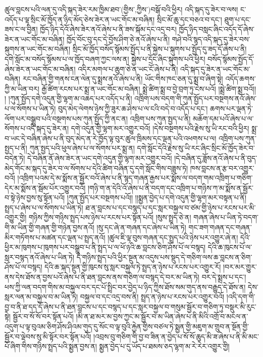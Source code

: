 ཚུལ་བླངས་པའི་ལན་དུ་འདི་སྐད་ཟེར་རམ་ཁྱིམ་ཐབ་(གྱིས་‚ཀྱིས་)བསྒོ་བའི་ཕྱིར། འདི་སྐད་དུ་ཟེར་བ་ལས། ང་འདོད་པ་ལྟ་སྲིང་མོ་ཁྱོད་ན་ཉིད་མོད་ཅེས་ཟེར་ན་ཡང་གོང་མ་བཞིན། སྲིང་མོ་ཆུ་དང་བཅའ་བ་དང་། ཐུག་པ་དང་ཟས་ང་ལ་བྱིན། ཁྱོད་ཉིད་དེའོ་ཞེས་ཟེར་ནའོ་ཞེས་པ་ནི་ཟས་སྐོམ་དང་འདྲ་བར། ཁྱོད་ཉིད་བསླང་ཞིང་འདོད་དོ་ཞེས་ཟེར་ན་ཡང་གོང་མ་བཞིན། ཁྱོད་བོང་བུ་དང་དེ་བྱོས་ཤིག་ཅེ་ནའོ་ཞེས་པ་ནི། གཤེ་བའི་སྙད་འདི་སྐད་དུ་ཟེར་བས་སྐུགས་ན་ཡང་གོང་མ་བཞིན། སྲིང་མོ་ཁྱོད་བསོད་སྙོམས་སྤྱོད་པ་ནི་སྐྱེས་པ་སྐུགས་པ་སྤྱོད་དུ་ཟད་དོ་ཞེས་པ་ནི། དགེ་སློང་མ་བསོད་སྙོམས་པ་ལ་ཁྱོད་བཞག་ཀྱང་ལས་ན། སྐྱེས་པ་དྲོང་ཞིང་སྐུགས་པའི་ཕྱིར། བསོད་སྙོམས་སྤྱོད་དོ་ཞེས་ཟེར་ན་ཡང་གོང་མ་བཞིན། འདིར་མགལ་པ་ཆུག་ཅེ་ན་ཡང་ངོ་ཞེས་པ་ནི། འདི་སྐད་དུ་ཟེར་ན་ཡང་གོང་མ་བཞིན། རང་བཞིན་གྱི་གནས་ངན་ལེན་དུ་སྨྲས་ནའོ་ཞེས་པ་ནི། ཡོང་གིས་ཁང་ཅན་དུ་སྨྲ་བ་ཞིག་སྟེ། འདོད་ཆགས་ཀྱི་མ་ཡིན་བར། རྒྱོ་ཚིག་རངས་པར་སྨྲ་ན་ཡང་གོང་མ་བཞིན། སྨྲེ་ཚིག་སྨྲ་བ་བྱེ་བྲག་ཏུ་ངེས་པའོ། །སྨྲེ་ཚིག་སྨྲ་བའོ།། །
།ཀུན་སྤྱོད་དགེ་འདུན་གྱི་ལྷག་མ་འཆད་པར་འདོད་པ་ནི། འཁྲིག་པས་བདག་གི་ཀུན་སྤྱོད་པར་བསྔགས་ནའོ་ཞེས་པ་ལ་སོགས་པ་ཡིན་ཏེ། བུད་མེད་ལེགས་ཉེས་ཀྱི་ཟུར་ཆ་ཤེས་པ་ལ་ངའི་བདེ་བ་འདོད་པ་དང་། ཆགས་པར་ལྡན་ཏེ་ལོག་པར་བསྒྲུབ་པའི་བསྔགས་པས་ཀུན་སྤྱོད་ཀྱི་ནང་ན། འཁྲིག་པས་ཀུན་སྤྱད་པ་ནི། མཆོག་དམ་པའོ་ཞེས་པ་ལ་སོགས་པ་འདི་སྐད་དུ་ཟེར་ན། དགེ་འདུན་གྱི་ལྷག་མར་འགྱུར་བའོ། །དེས་བསྔགས་པའི་རྗེས་སུ་ཡི་རང་བའི་ཕྱིར། སྨྲ་བ་ཡང་དེ་བཞིན་ཞེས་པ་ནི་བུད་མེད་ན་རེ་ཁྱོད་ལྟ་བུར་ཚུལ་ཁྲིམས་དང་ལྡན་པའི་འཕགས་པ་ལ། འཁྲིག་པས་ཀུན་སྤྱད་པ་ནི། ཀུན་སྤྱད་པའི་ཕུལ་ཞེས་པ་ལ་སོགས་པར་སྨྲ་ན། དགེ་སློང་དེའི་རྗེས་སུ་ཡི་རང་ཞིང་སྲིང་མོ་ཁྱོད་ཟེར་བ་བདེན་ཏེ། དེ་བཞིན་ནོ་ཞེས་ཟེར་ན་ཡང་དགེ་འདུན་གྱི་ལྷག་མར་འགྱུར་བའོ། །དེ་བཞིན་དུ་ཟློས་ནའོ་ཞེས་པ་ནི་བུད་མེད་གོང་མ་སྐད་དུ་ཟེར་བ་ལ་སོགས་པ་དེའི་ཚིག་བཞིན་དུ་དགེ་སློང་གིས་བཟླས་ཏེ། ཁས་བླངས་ན་རྩ་བར་འགྱུར་བའོ། །འཁྲིག་པའམ་དེ་མ་སྨོས་ན་སྦྱོར་བའོ་ཞེས་པ་ནི་སྙད་གཞན་རྒྱས་པར་སྨོས་ལ་བདག་གམ་འཁྲིག་པ་གཅིག་དེར་མ་སྨོས་ན་སྦོམ་པོར་འགྱུར་བའོ། །གཉི་ག་ན་དེའི་འོ་ཞེས་པ་ནི་བདག་དང་འཁྲིག་པ་གཉིས་ཀ་མ་སྨོས་ན་སྦྱོར་བ་སྟེ་ཉེས་བྱས་སུ་སྟོན་པའོ། །ཀུན་སྤྱོད་པར་བསྔགས་པའོ།། །།སྨྱན་བྱེད་པ་དགེ་འདུན་གྱི་ལྷག་མར་བསྟན་པ་ནི། སྤྲད་པ་ཞེས་པ་ལ་སོགས་པ་ཡིན་ཏེ། ཐ་ན་བླངས་པ་དང་བསྙད་པ་དང་སླར་བསྐྱལ་བ་ཙམ་གྱི་ཉེས་པ་རངས་པར་མི་འགྱུར་གྱི། གཉིས་ཀྱིས་གཉིས་སྤྲད་པས་ཉེས་པ་རངས་པར་སྟོན་པའོ། །སུས་སྤྲད་ཅེ་ན། གཞན་ཞེས་པ་ཡིན་ཏེ་བདག་གི་མ་ཡིན་གྱི་གཞན་གྱི་གཉེན་བྱས་ནའོ། །སུ་དང་ཞེ་ན་གཞན་དང་ཞེས་པ་ཡིན་ཏེ། གང་ཟག་གཞན་དང་གཞན་མིར་གཏོགས་པ་མཚན་དང་ལྡན་པ་སྤྲད་ནའོ། །ཚུལ་ཇི་ལྟ་བུས་གཞན་དང་སྤྲད་པའི་ཉེས་པར་འགྱུར་ཞེ་ན། དེའི་ཕྱིར་མ་ཁུགས་པ་ཁུགས་པར་བསྒྲུབ་པ་ནི་སྤྲད་པ་ལ་ཕོ་ཉའི་ཆ་བླངས་ཅིག་ཤོས་པོ་ལ་བསྙད། དེའི་ཆ་ཁུངས་པོ་ལ་སླར་བསྙད་ནའོ་ཞེས་པ་ཡིན་ཏེ། དེ་གཉིས་སྤྲད་པའི་ཕྱིར་སྔུན་མ་འདུས་པས་སྡུད་དེ་གཅིག་ལས་ཆ་བླངས་ན་ཅིག་ཤོས་པོ་ལ་བསྙད། དེའི་ཆ་སྐད་སྔུན་གྱི་ཁུངས་སུ་སླར་བསྐྱལ་ཏེ་སྤྲད་ན་ཉེས་པ་རངས་པར་འགྱུར་རོ། །བར་མར་གྱུར་ནས་དེས་ཐོས་ན་བྱས་པའོ་ཞེས་པ་ནི་ཐན་བླངས་ནས་གཅིག་ལ་བསྙད་དེ་བར་མ་ཡིན་ཏེ། བར་དེ་སྨྲས་པ་དང་། ཕས་ཀྱི་ལན་བདག་གིས་མ་བསྐྱལ་བར་དང་པོ་སྤྲིང་བར་བྱེད་པ་ཉིད་ཀྱིས་ཐོས་སམ་གུད་ནས་བརྒྱུད་དེ་ཐོས་ན། དེས་སླར་ལན་མ་བསྐྱལ་བ་མ་ཡིན་ཏེ། བསྐྱལ་བ་དང་འདྲ་བས་ནི། སྤྲད་ན་ཉེས་པ་རངས་པར་འགྱུར་བའོ། །འདི་དག་གི་བྱ་བ་ནི་ཐ་དད་དོ་ཞེས་པ་ནི་ཐན་བླངས་པ་དང་བསྙད་པ་དང་སླར་བསྐྱལ་བ་གསུམ་སྦྱོར་བ་གཅིག་ཏུ་བསྡུར་མི་རུང་སྟེ། སྦྱོར་བ་སོ་སོ་བར་སྟོན་པའོ། །མི་ན་ཐ་མར་མ་བྱས་ཀྱང་མ་སྦྱོར་བ་མ་ཡིན་ཞེས་པ་ནི་མིའི་འགྲོ་བ་མངལ་ན་འདུག་པ་ལྟ་བུའམ་ཅིག་ཤོས་ཤིའམ་གུད་དུ་སོང་བ་ལྟ་བུའི་རྐྱེན་གྱིས་བཙལ་ཏེ་སྨྱན་གྱི་མཇུག་མ་གྲུབ་ན་སྔོན་གྱི་སྦྱོར་བ་ལྡེབས་སུ་མི་སྟོར་བར་སྟོན་པའོ། །འབྲས་བུ་གཅིག་གི་བྱ་བ་ཟིན་ན་བྱེད་པ་སོ་སོ་ཆུད་མི་ཟ་ཞེས་པ་ནི་མི་མང་པོ་ཞིག་གིས་གཉིས་སྤྲད་པའི་སྨྱན་བྱས་ན། སྨྱན་བྱེད་པ་དུ་ཡོད་པ་ཐམས་ཅད་ལྷག་མ་རེ་རེར་འགྱུར་གྱི། 